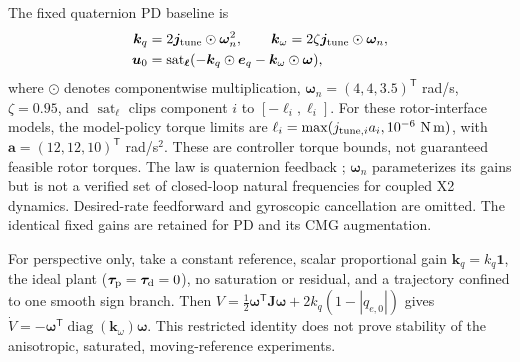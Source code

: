 \documentclass[letterpaper,10pt,conference]{IEEEtran}
\newcommand{\T}{^{\mathsf T}}
\newcommand{\sat}{\operatorname{sat}}
\begin{document}
The fixed quaternion PD baseline is
\begin{align}
 \bm k_q&=2\bm j_{\rm tune}\odot\bm\omega_n^2,\qquad
 \bm k_\omega=2\zeta\bm j_{\rm tune}\odot\bm\omega_n,\\
 \bm u_0&=\sat_{\bm\ell}
       (-\bm k_q\odot\bm e_q-\bm k_\omega\odot\bm\omega),
 \label{eq:pd}
\end{align}
where $\odot$ denotes componentwise multiplication,
$\bm\omega_n=(4,4,3.5)\T$ rad/s, $\zeta=0.95$, and
$\sat_{\bm\ell}$ clips component $i$ to $[-\ell_i,\ell_i]$.
For these rotor-interface models, the model-policy torque limits are
$\ell_i=\max(j_{{\rm tune},i}a_i,10^{-6}\ \mathrm{N\,m})$,
with $\bm a=(12,12,10)\T$ rad/s$^2$.
These are controller torque bounds, not guaranteed feasible rotor torques.
The law is quaternion feedback \cite{fresk2013quaternion};
$\bm\omega_n$ parameterizes its gains but is not a verified set of
closed-loop natural frequencies for coupled X2 dynamics.
Desired-rate feedforward and gyroscopic cancellation are omitted.
The identical fixed gains are retained for PD and its CMG augmentation.

For perspective only, take a constant reference, scalar proportional
gain $\bm k_q=k_q\bm1$, the ideal plant
($\bm\tau_{\rm p}=\bm\tau_{\rm d}=0$), no saturation or residual, and a
trajectory confined to one smooth sign branch. Then
$V=\frac12\bm\omega\T\bm J\bm\omega+2k_q(1-|q_{e,0}|)$ gives
$\dot V=-\bm\omega\T\operatorname{diag}(\bm k_\omega)\bm\omega$.
This restricted identity does not prove stability of the anisotropic,
saturated, moving-reference experiments.
\end{document}
